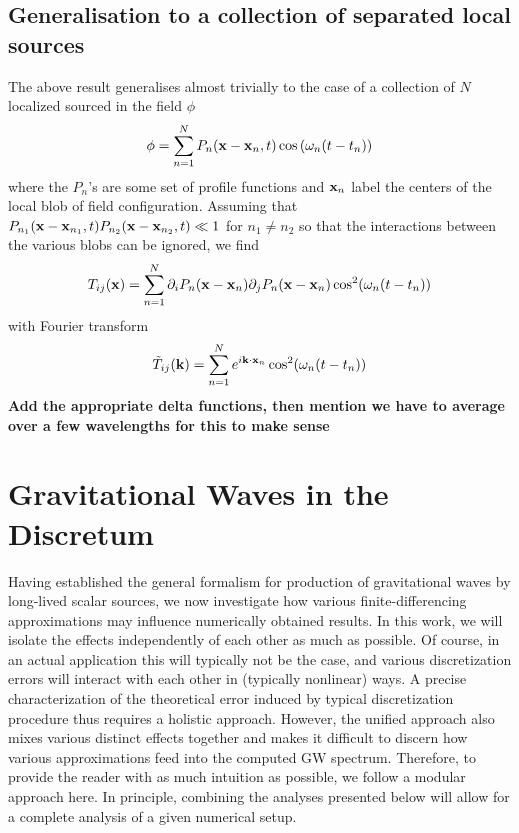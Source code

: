 \documentclass{revtex4}
\begin{document}


\subsection{Generalisation to a collection of separated local sources}
The above result generalises almost trivially to the case of a collection of $N$ localized sourced in the field $\phi$
\begin{equation}
  \phi = \sum_{n=1}^{N} P_n({\bf x-x}_n,t)\cos\left(\omega_n(t-t_n)\right)
\end{equation}
where the $P_n$'s are some set of profile functions and ${\bf x}_n$ label the centers of the local blob of field configuration.
Assuming that $P_{n_1}({\bf x-x}_{n_1},t)P_{n_{2}}({\bf x - x}_{n_2},t) \ll 1$ for $n_1 \neq n_2$ so that the interactions between the various blobs can be ignored, we find
\begin{equation}
  T_{ij}({\bf x}) = \sum_{n=1}^N\partial_iP_n({\bf x-x}_n)\partial_jP_n({\bf x-x}_n)\cos^2(\omega_n(t-t_n))
\end{equation}
with Fourier transform
\begin{equation}
  \tilde{T}_{ij}({\bf k}) = \sum_{n=1}^Ne^{i{\bf k}\cdot {\bf x}_n}\cos^2(\omega_n(t-t_n))
\end{equation}
{\bf Add the appropriate delta functions, then mention we have to average over a few wavelengths for this to make sense}

\section{Gravitational Waves in the Discretum}
Having established the general formalism for production of gravitational waves by long-lived scalar sources, we now investigate how various finite-differencing approximations may influence numerically obtained results.
In this work, we will isolate the effects independently of each other as much as possible.
Of course, in an actual application this will typically not be the case, and various discretization errors will interact with each other in (typically nonlinear) ways.
A precise characterization of the theoretical error induced by typical discretization procedure thus requires a holistic approach.
However, the unified approach also mixes various distinct effects together and makes it difficult to discern how various approximations feed into the computed GW spectrum.
Therefore, to provide the reader with as much intuition as possible, we follow a modular approach here.
In principle, combining the analyses presented below will allow for a complete analysis of a given numerical setup.
\end{document}
